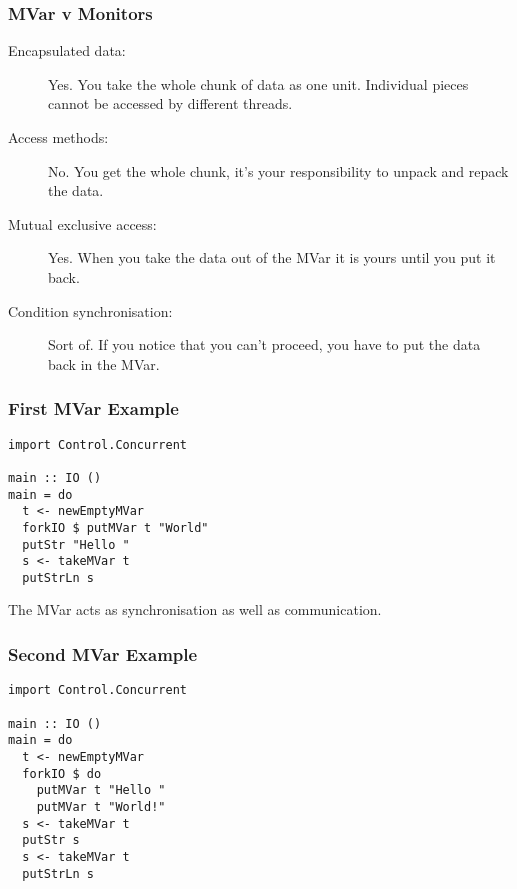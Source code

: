 \documentclass[notheorems]{beamer}%
\theoremstyle{definition}
\begin{document}
\begin{frame}
  \frametitle{MVar v Monitors}
  \begin{description}
  \item[Encapsulated data:] Yes. You take the whole chunk of data as one
    unit. Individual pieces cannot be accessed by different threads.
  \item[Access methods:] No. You get the whole chunk, it's your responsibility
    to unpack and repack the data.
  \item[Mutual exclusive access:] Yes. When you take the data out of the MVar
    it is yours until you put it back.
  \item[Condition synchronisation:] Sort of. If you notice that you can't
    proceed, you have to put the data back in the MVar.
  \end{description}
\end{frame}

\begin{frame}[fragile]
  \frametitle{First MVar Example}
\begin{verbatim}
import Control.Concurrent

main :: IO ()
main = do
  t <- newEmptyMVar
  forkIO $ putMVar t "World"
  putStr "Hello "
  s <- takeMVar t
  putStrLn s
\end{verbatim}
  The MVar acts as \alert{synchronisation} as well as
  \alert{communication}.
\end{frame}

\begin{frame}[fragile]
  \frametitle{Second MVar Example}
\begin{verbatim}
import Control.Concurrent

main :: IO ()
main = do
  t <- newEmptyMVar
  forkIO $ do
    putMVar t "Hello "
    putMVar t "World!"
  s <- takeMVar t
  putStr s
  s <- takeMVar t
  putStrLn s
\end{verbatim}
\end{frame}
\end{document}
